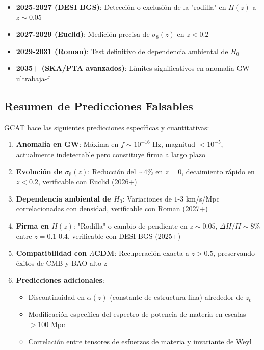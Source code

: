\documentclass[12pt, a4paper]{article}
\theoremstyle{plain}
\theoremstyle{definition}
\begin{document}
\begin{itemize}
    \item \textbf{2025-2027 (DESI BGS)}: Detección o exclusión de la "rodilla" en $H(z)$ a $z \sim 0.05$
    \item \textbf{2027-2029 (Euclid)}: Medición precisa de $\sigma_8(z)$ en $z < 0.2$
    \item \textbf{2029-2031 (Roman)}: Test definitivo de dependencia ambiental de $H_0$
    \item \textbf{2035+ (SKA/PTA avanzados)}: Límites significativos en anomalía GW ultrabaja-f
\end{itemize}

\subsection{Resumen de Predicciones Falsables}

GCAT hace las siguientes predicciones específicas y cuantitativas:

\begin{enumerate}
    \item \textbf{Anomalía en GW}: Máxima en $f \sim 10^{-16}$ Hz, magnitud $< 10^{-5}$, actualmente indetectable pero constituye firma a largo plazo
    
    \item \textbf{Evolución de $\sigma_8(z)$}: Reducción del $\sim 4\%$ en $z=0$, decaimiento rápido en $z < 0.2$, verificable con Euclid (2026+)
    
    \item \textbf{Dependencia ambiental de $H_0$}: Variaciones de $1$-$3$ km/s/Mpc correlacionadas con densidad, verificable con Roman (2027+)
    
    \item \textbf{Firma en $H(z)$}: "Rodilla" o cambio de pendiente en $z \sim 0.05$, $\Delta H/H \sim 8\%$ entre $z=0.1$-$0.4$, verificable con DESI BGS (2025+)
    
    \item \textbf{Compatibilidad con $\Lambda$CDM}: Recuperación exacta a $z > 0.5$, preservando éxitos de CMB y BAO alto-z
    
    \item \textbf{Predicciones adicionales}:
    \begin{itemize}
        \item Discontinuidad en $\alpha(z)$ (constante de estructura fina) alrededor de $z_c$
        \item Modificación específica del espectro de potencia de materia en escalas $> 100$ Mpc
        \item Correlación entre tensores de esfuerzos de materia y invariante de Weyl
    \end{itemize}
\end{enumerate}
\end{document}
